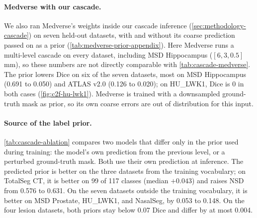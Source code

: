 \documentclass[hidelinks, a4paper, 12pt, ngerman, english]{article}  %
\begin{document}
\paragraph{Medverse with our cascade.}
We also ran Medverse's weights inside our cascade inference
(\autoref{sec:methodology-cascade}) on seven held-out datasets, with and
without its coarse prediction passed on as a prior
(\autoref{tab:medverse-prior-appendix}). Here Medverse runs a multi-level
cascade on every dataset, including MSD Hippocampus ($[6, 3, 0.5]$\,mm), so
these numbers are not directly comparable with \autoref{tab:cascade-medverse}.
The prior lowers Dice on six of the seven datasets, most on MSD Hippocampus
(0.691 to 0.050) and ATLAS v2.0 (0.126 to 0.020); on HU\_LWK1, Dice is 0 in
both cases (\autoref{fig:c2f-hu-lwk1}). Medverse is trained with a downsampled
ground-truth mask as prior, so its own coarse errors are out of distribution
for this input.

\paragraph{Source of the label prior.}
\autoref{tab:cascade-ablation} compares two models that differ only in the
prior used during training: the model's own prediction from the previous
level, or a perturbed ground-truth mask. Both use their own prediction at
inference. The predicted prior is better on the three datasets from the
training vocabulary; on TotalSeg CT, it is better on 99 of 117 classes
(median $+0.043$) and raises NSD from 0.576 to 0.631. On the seven datasets
outside the training vocabulary, it is better on MSD Prostate, HU\_LWK1, and
NasalSeg, by 0.053 to 0.148. On the four lesion datasets, both priors stay
below 0.07 Dice and differ by at most 0.004.
\end{document}
